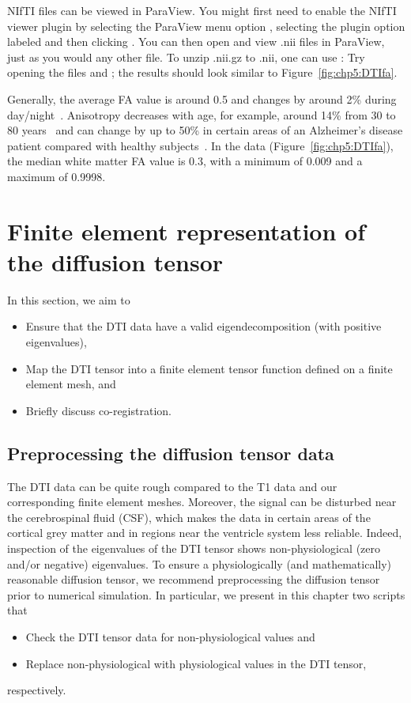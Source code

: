 NIfTI files can be viewed in ParaView. You might first need to enable
the NIfTI viewer plugin by selecting the ParaView menu option
, selecting the plugin option labeled
 and then clicking . You
can then open and view .nii files in ParaView, just as you would any other
file. To unzip .nii.gz to .nii, one can use :
\noindent Try opening the files  and
; the results should look similar to 
Figure~\ref{fig:chp5:DTIfa}.

Generally, the average FA value is around 0.5 and changes by around 2\%
during day/night~\cite{voldsbekk2020evidence}.  Anisotropy decreases
with age, for example, around 14\% from 30 to 80
years~\cite{kochunov2011fractional} and can change by up to
50\% in certain areas of an Alzheimer's disease patient compared with
healthy subjects~\cite{naggara2006diffusion}. In the  data 
(Figure~\ref{fig:chp5:DTIfa}), the median white matter FA value is
0.3, with a minimum of 0.009 and a maximum of 0.9998.

\section{Finite element representation of the diffusion tensor}

In this section, we aim to
\begin{itemize}
\item
  Ensure that the DTI data have a valid eigendecomposition (with positive eigenvalues),
\item
  Map the DTI tensor into a finite element tensor function defined on
  a finite element mesh, and
\item
  Briefly discuss co-registration.
\end{itemize}

\subsection{Preprocessing the diffusion tensor data}

The DTI data can be quite rough compared to the T1 data and our
corresponding finite element meshes. Moreover, the signal can be
disturbed near the cerebrospinal fluid (CSF), which makes the data in certain areas of
the cortical grey matter and in regions near the ventricle system
less reliable. Indeed, inspection of the eigenvalues of the DTI tensor
shows non-physiological (zero and/or negative) eigenvalues. To ensure
a physiologically (and mathematically) reasonable diffusion tensor, we
recommend preprocessing the diffusion tensor prior to numerical
simulation. In particular, we present in this chapter two scripts that
\begin{itemize}
\item
  Check the DTI tensor data for non-physiological values and
\item
  Replace non-physiological with physiological values in the DTI tensor,
\end{itemize}
respectively.

